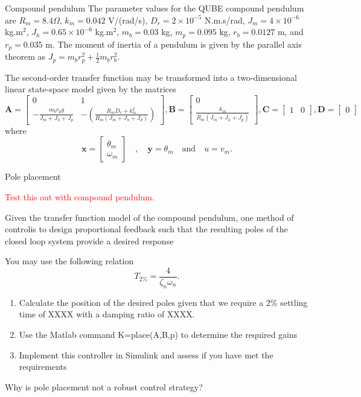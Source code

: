 \documentclass[9pt]{beamer-control}
\begin{document}
\begin{frame}{Compound pendulum}
The parameter values for the QUBE compound pendulum are $R_m=8.4\Omega$, $k_m=0.042$ V/(rad/s), $D_r=2\times 10^{-5}$ N.m.s/rad, $J_m = 4\times 10^{-6}$ kg.m$^2$, $J_h = 0.65 \times 10^{-6}$ kg.m$^2$, $m_b=0.03$ kg, $m_p=0.095$ kg, $r_b = 0.0127$ m, and $r_p = 0.035$ m.
The moment of inertia of a pendulum is given by the parallel axis theorem as $J_p = m_b r_p^2+ \tfrac{1}{2}m_b r_b^2$.

The second-order transfer function may be transformed into a two-dimensional linear state-space model given by the matrices
\[
\mathbf{A}=\begin{bmatrix}
	0 & 1 \\
	-\tfrac{m_br_p g }{J_m+J_h+J_p} & -\left(\tfrac{R_m D_r + k_m^2}{R_m(J_m+J_h+J_d)}\right)
\end{bmatrix},
\mathbf{B} = \begin{bmatrix}
	0 \\ \tfrac{k_m}{R_m(J_m+J_h+J_p)}
\end{bmatrix}, 
\mathbf{C} = \begin{bmatrix}
	1 & 0
\end{bmatrix},
\mathbf{D} = \begin{bmatrix}
	0
\end{bmatrix}
\]  
where 
\[\mathbf{x} = \begin{bmatrix}
	\theta_m \\ \omega_m
\end{bmatrix}
\quad , \quad \mathbf{y} = \theta_m \quad  \text{and} \quad u=v_m.\]
\end{frame}




\begin{frame}{Pole placement}

\textcolor{red}{Test this out with compound pendulum.}

Given the transfer function model of the compound pendulum, one method of controlis to design proportional feedback such that the resulting poles of the closed loop system provide a desired response

You may use the following relation
\[ T_{2\%} = \frac{4}{\zeta_n \omega_n}. \]

\begin{enumerate}
	\item Calculate the position of the desired poles given that we require a 2\% settling time of XXXX with a damping ratio of XXXX. 
	\item Use the Matlab command K=place(A,B,p) to determine the required gains 
	\item Implement this controller in Simulink and assess if you have met the requirements
\end{enumerate}

Why is pole placement not a robust control strategy?

\end{frame}
\end{document}
